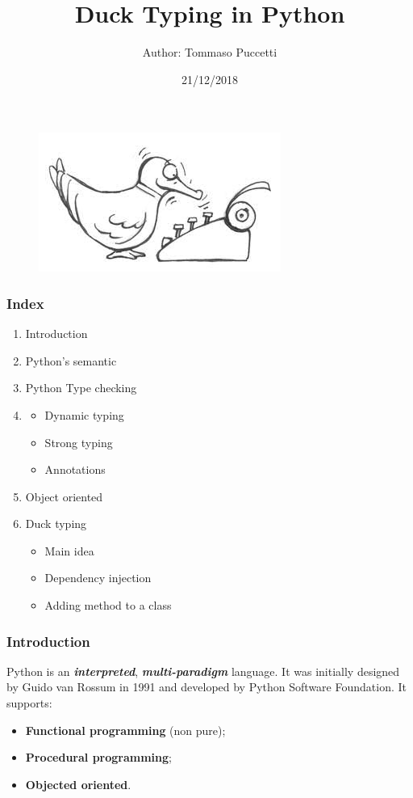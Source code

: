 \documentclass[xcolor ={table,usenames,dvipsnames}]{beamer}
\title{Duck Typing in Python}
\author{Author: Tommaso Puccetti}
\institute{Universit\`a  degli Studi di Firenze}
\date{21/12/2018}
\theoremstyle{definition}
\begin{document}
	
	\begin{frame}
		\maketitle
			\begin{figure}[h!]
			\centering
			\includegraphics[scale=2]{img/cartoonduck.jpg}
			\label{Interfacce di un CS}
		\end{figure}
	\end{frame}

	\begin{frame}
		\frametitle{Index}
		\begin{enumerate}
			\item Introduction
			\item Python's semantic
			\item Python Type checking
			\item \begin{itemize}
					\item Dynamic typing
					\item Strong typing
					\item Annotations
				  \end{itemize}
			\item Object oriented
			\item Duck typing
				  \begin{itemize}
				  	\item Main idea
				  	\item Dependency injection
				  	\item Adding method to a class
				  \end{itemize}
		\end{enumerate}
	\end{frame}

	\begin{frame}
		\frametitle{Introduction}
		Python is an \textit{\textbf{interpreted}}, \textit{\textbf{multi-paradigm}} language. It was initially designed by Guido van Rossum in 1991 and developed by Python Software Foundation. It supports:
		\begin{itemize}
			\item \textbf{Functional programming } (non pure);
			\item \textbf{Procedural programming};
			\item \textbf{Objected oriented}.
		\end{itemize}
	\end{frame}
\end{document}
